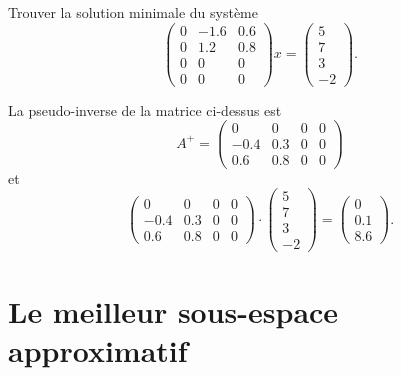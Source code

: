 \begin{example}
  \label{exe:20}
  Trouver la solution minimale du système 
  \begin{displaymath}
     \begin{pmatrix}
      0 & -1.6  & 0.6 \\
      0 & 1.2 & 0.8 \\
      0 & 0 & 0 \\
      0 & 0 & 0
    \end{pmatrix} x =
    \begin{pmatrix}
      5\\7\\3\\-2
    \end{pmatrix}.
  \end{displaymath}

La pseudo-inverse  de la matrice ci-dessus est 
\begin{displaymath}
  A^+ = \begin{pmatrix}0 & 0 & 0 & 0\\-0.4 & 0.3 & 0 & 0\\0.6 & 0.8 & 0 & 0\end{pmatrix}
\end{displaymath}
et 
\begin{displaymath}
  \begin{pmatrix}0 & 0 & 0 & 0\\-0.4 & 0.3 & 0 & 0\\0.6 & 0.8 & 0 & 0\end{pmatrix} \cdot
  \begin{pmatrix}
    5\\7\\3\\-2
  \end{pmatrix}
 =
 \begin{pmatrix}
   0\\0.1\\8.6
 \end{pmatrix}. 
\end{displaymath}
\end{example}





\section{Le meilleur sous-espace approximatif} 
\label{sec:le-meilleur-sous}

